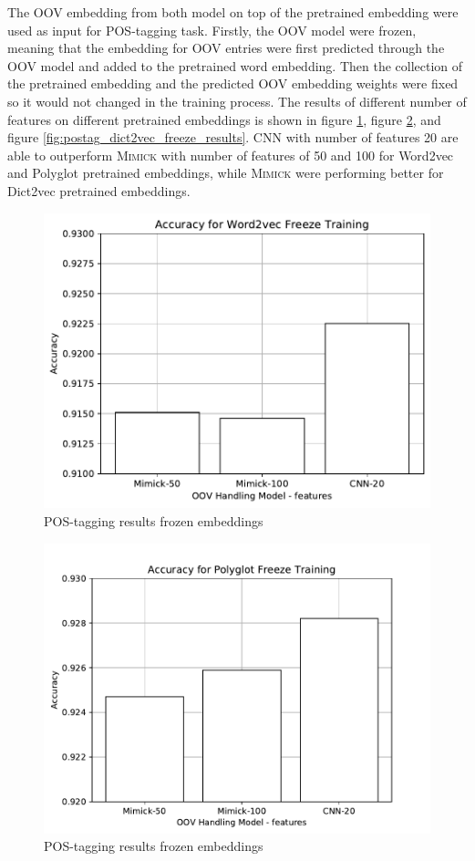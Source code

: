       The OOV embedding from both model on top of the pretrained
      embedding were used as input for POS-tagging task. Firstly, the
      OOV model were frozen, meaning that the embedding for OOV
      entries were first predicted through the OOV model and added to
      the pretrained word embedding. Then the collection of the
      pretrained embedding and the predicted OOV embedding weights
      were fixed so it would not changed in the training process. The
      results of different number of features on different pretrained
      embeddings is shown in figure
      \ref{fig:postag_word2vec_freeze_results}, 
      figure \ref{fig:postag_polyglot_freeze_results}, and figure
      \ref{fig:postag_dict2vec_freeze_results}. CNN with number
      of features 20 are able to outperform \textsc{Mimick} with
      number of features of 50 and 100 for Word2vec and Polyglot
      pretrained embeddings, while \textsc{Mimick} were performing
      better for Dict2vec pretrained embeddings.
      \begin{figure}[t]
        \centering
        \includegraphics[width=0.8\linewidth]{images/freeze_word2vec.pdf}
        \caption{POS-tagging results frozen embeddings}
        \label{fig:postag_word2vec_freeze_results}
      \end{figure}
      \begin{figure}[H]
        \centering
        \includegraphics[width=0.8\linewidth]{images/freeze_polyglot.pdf}
        \caption{POS-tagging results frozen embeddings}
        \label{fig:postag_polyglot_freeze_results}
      \end{figure}
